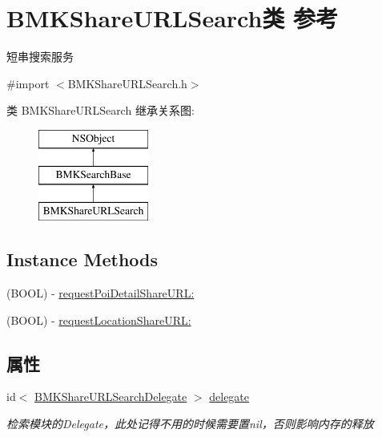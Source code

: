 \hypertarget{interface_b_m_k_share_u_r_l_search}{}\section{B\+M\+K\+Share\+U\+R\+L\+Search类 参考}
\label{interface_b_m_k_share_u_r_l_search}


短串搜索服务  




{\ttfamily \#import $<$B\+M\+K\+Share\+U\+R\+L\+Search.\+h$>$}

类 B\+M\+K\+Share\+U\+R\+L\+Search 继承关系图\+:\begin{figure}[H]
\begin{center}
\leavevmode
\includegraphics[height=3.000000cm]{interface_b_m_k_share_u_r_l_search}
\end{center}
\end{figure}
\subsection*{Instance Methods}
\begin{DoxyCompactItemize}
\item 
(B\+O\+O\+L) -\/ \hyperlink{interface_b_m_k_share_u_r_l_search_a91351e2591a3918fc233ba8ca42c83be}{request\+Poi\+Detail\+Share\+U\+R\+L\+:}
\item 
(B\+O\+O\+L) -\/ \hyperlink{interface_b_m_k_share_u_r_l_search_a42ece3de1f45f2fd3be760f78e37b9b2}{request\+Location\+Share\+U\+R\+L\+:}
\end{DoxyCompactItemize}
\subsection*{属性}
\begin{DoxyCompactItemize}
\item 
\hypertarget{interface_b_m_k_share_u_r_l_search_af3d6d7b5ecf6c9b09b292c1684dad3db}{}id$<$ \hyperlink{protocol_b_m_k_share_u_r_l_search_delegate-p}{B\+M\+K\+Share\+U\+R\+L\+Search\+Delegate} $>$ \hyperlink{interface_b_m_k_share_u_r_l_search_af3d6d7b5ecf6c9b09b292c1684dad3db}{delegate}\label{interface_b_m_k_share_u_r_l_search_af3d6d7b5ecf6c9b09b292c1684dad3db}

\begin{DoxyCompactList}\small\item\em 检索模块的\+Delegate，此处记得不用的时候需要置nil，否则影响内存的释放 \end{DoxyCompactList}\end{DoxyCompactItemize}


